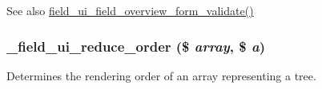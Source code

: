 \begin{DoxySeeAlso}{See also}
\hyperlink{field__ui_8admin_8inc_a1e5fb5a6f69ee3f155c3b433ad78ba1e}{field\_\-ui\_\-field\_\-overview\_\-form\_\-validate()} 
\end{DoxySeeAlso}
\hypertarget{field__ui_8admin_8inc_ae35d5b4422a3682ca5f8f5251dbde04d}{
\subsubsection[{\_\-field\_\-ui\_\-reduce\_\-order}]{\setlength{\rightskip}{0pt plus 5cm}\_\-field\_\-ui\_\-reduce\_\-order (\$ {\em array}, \/  \$ {\em a})}}
\label{field__ui_8admin_8inc_ae35d5b4422a3682ca5f8f5251dbde04d}
Determines the rendering order of an array representing a tree.

